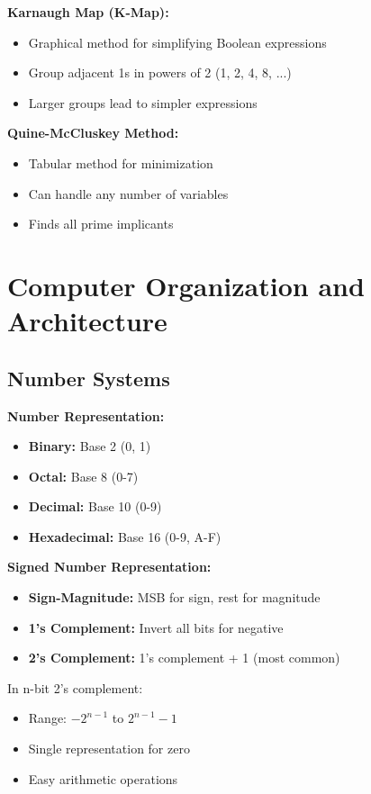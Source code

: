 \documentclass[11pt,a4paper]{article}
\begin{document}
\textbf{Karnaugh Map (K-Map):}
\begin{itemize}
    \item Graphical method for simplifying Boolean expressions
    \item Group adjacent 1s in powers of 2 (1, 2, 4, 8, ...)
    \item Larger groups lead to simpler expressions
\end{itemize}

\textbf{Quine-McCluskey Method:}
\begin{itemize}
    \item Tabular method for minimization
    \item Can handle any number of variables
    \item Finds all prime implicants
\end{itemize}

\section{Computer Organization and Architecture}

\subsection{Number Systems}

\textbf{Number Representation:}
\begin{itemize}
    \item \textbf{Binary:} Base 2 (0, 1)
    \item \textbf{Octal:} Base 8 (0-7)
    \item \textbf{Decimal:} Base 10 (0-9)
    \item \textbf{Hexadecimal:} Base 16 (0-9, A-F)
\end{itemize}

\textbf{Signed Number Representation:}
\begin{itemize}
    \item \textbf{Sign-Magnitude:} MSB for sign, rest for magnitude
    \item \textbf{1's Complement:} Invert all bits for negative
    \item \textbf{2's Complement:} 1's complement + 1 (most common)
\end{itemize}

\begin{notebox}
In n-bit 2's complement:
\begin{itemize}
    \item Range: $-2^{n-1}$ to $2^{n-1}-1$
    \item Single representation for zero
    \item Easy arithmetic operations
\end{itemize}
\end{notebox}
\end{document}
